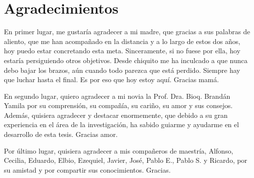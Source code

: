 \chapter*{Agradecimientos}
\label{chap:agradecimientos}
En primer lugar, me gustaría agradecer a mi madre, que gracias a sus palabras de aliento, 
que me han acompañado en la distancia y a lo largo de estos dos años, hoy puedo estar
concretando esta meta. Sinceramente, si no fuese por ella, hoy estaría persiguiendo
otros objetivos. Desde chiquito me ha inculcado a que nunca debo bajar los brazos,
aún cuando todo parezca que está perdido. Siempre hay que luchar hasta el final.
Es por eso que hoy estoy aquí. Gracias mamá.

En segundo lugar, quiero agradecer a mi novia la Prof. Dra. Bioq. Brandán Yamila por su
comprensión, su compañía, su cariño, su amor y sus consejos. Además, quisiera agradecer y destacar
enormemente, que debido a su gran experiencia en el área de la investigación,
ha sabido guiarme y ayudarme en el desarrollo de esta tesis. Gracias amor. 

Por último lugar, quisiera agradecer a mis compañeros de maestría, Alfonso, Cecilia,
Eduardo, Elbio, Ezequiel, Javier, José, Pablo E., Pablo S. y Ricardo, por su amistad y
por compartir sus conocimientos. Gracias.




